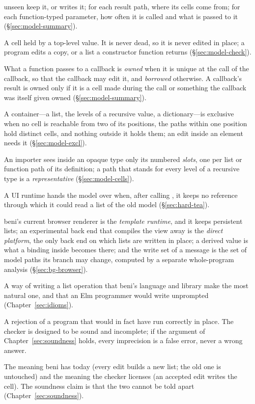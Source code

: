 \begin{description}[leftmargin=1.2em,font=\normalfont\bfseries]
unseen keep it, or writes it; for each result path, where its cells come from; for each function-typed
parameter, how often it is called and what is passed to it (\S\ref{sec:model-summary}).
\item[Shared.] A cell held by a top-level value. It is never dead, so it is never edited in place; a
program edits a copy, or a list a constructor function returns (\S\ref{sec:model-check}).
\item[Owned, borrowed.] What a function passes to a callback is \emph{owned} when it is unique at the
call of the callback, so that the callback may edit it, and \emph{borrowed} otherwise. A callback's result
is owned only if it is a cell made during the call or something the callback was itself given owned
(\S\ref{sec:model-summary}).
\item[Exclusive.] A container---a list, the levels of a recursive value, a dictionary---is exclusive when no
cell is reachable from two of its positions, the paths within one position hold distinct cells, and
nothing outside it holds them; an edit inside an element needs it (\S\ref{sec:model-excl}).
\item[Slot, representative.] An importer sees inside an opaque type only its numbered \emph{slots}, one
per list or function path of its definition; a path that stands for every level of a recursive type is a
\emph{representative} (\S\ref{sec:model-cells}).
\item[Hand-over.] A UI runtime hands the model over when, after calling , it keeps no
reference through which it could read a list of the old model (\S\ref{sec:hard-tea}).
\item[Direct platform, template runtime, derived value, write set.] beni's current browser renderer is
the \emph{template runtime}, and it keeps persistent lists; an experimental back end that compiles the view
away is the \emph{direct platform}, the only back end on which lists are written in place; a derived value is what a binding inside  becomes there; and the write set of a
message is the set of model paths its  branch may change, computed by a separate
whole-program analysis (\S\ref{sec:bg-browser}).
\item[Idiom.] A way of writing a list operation that beni's language and library make the most natural
one, and that an Elm programmer would write unprompted (Chapter~\ref{sec:idioms}).
\item[False error.] A rejection of a program that would in fact have run correctly in place. The
checker is designed to be sound and incomplete; if the argument of Chapter~\ref{sec:soundness} holds,
every imprecision is a false error, never a wrong answer.
\item[Value semantics, update semantics.] The meaning beni has today (every edit builds a new list;
the old one is untouched) and the meaning the checker licenses (an accepted edit writes the cell). The
soundness claim is that the two cannot be told apart (Chapter~\ref{sec:soundness}).
\end{description}
